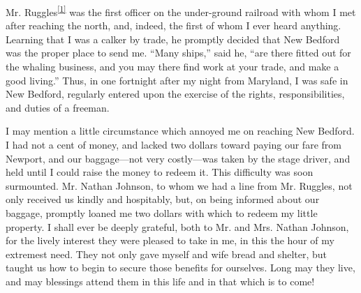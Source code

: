 Mr. Ruggles\textsuperscript{\protect\hyperlink{cite_note-1}{{[}1{]}}}
was the first officer on the under-ground railroad with whom I met after
reaching the north, and, indeed, the first of whom I ever heard
anything. Learning that I was a calker by trade, he promptly decided
that New Bedford was the proper place to send me. ``Many ships,'' said
he, ``are there fitted out for the whaling business, and you may there
find work at your trade, and make a good living.'' Thus, in one
fortnight after my night from Maryland, I was safe in New Bedford,
regularly entered upon the exercise of the rights, responsibilities, and
duties of a freeman.

I may mention a little circumstance which annoyed me on reaching New
Bedford. I had not a cent of money, and lacked two dollars toward paying
our fare from Newport, and our baggage---not very
{\protect\hypertarget{342}{}{}}costly---was taken by the stage driver,
and held until I could raise the money to redeem it. This difficulty was
soon surmounted. Mr. Nathan Johnson, to whom we had a line from Mr.
Ruggles, not only received us kindly and hospitably, but, on being
informed about our baggage, promptly loaned me two dollars with which to
redeem my little property. I shall ever be deeply grateful, both to Mr.
and Mrs. Nathan Johnson, for the lively interest they were pleased to
take in me, in this the hour of my extremest need. They not only gave
myself and wife bread and shelter, but taught us how to begin to secure
those benefits for ourselves. Long may they live, and may blessings
attend them in this life and in that which is to come!

